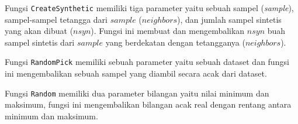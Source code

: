 Fungsi \texttt{CreateSynthetic} memiliki tiga parameter yaitu sebuah sampel
(\textit{sample}), sampel-sampel tetangga dari $sample$ ($neighbors$), dan
jumlah sampel sintetis yang akan dibuat ($nsyn$).
Fungsi ini membuat dan mengembalikan $nsyn$ buah sampel sintetis dari $sample$
yang berdekatan dengan tetangganya ($neighbors$).

Fungsi \texttt{RandomPick} memiliki sebuah parameter yaitu sebuah dataset dan
fungsi ini mengembalikan sebuah sampel yang diambil secara acak dari dataset.

Fungsi \texttt{Random} memiliki dua parameter bilangan yaitu nilai minimum dan
maksimum, fungsi ini mengembalikan bilangan acak real dengan rentang antara
minimum dan maksimum.
